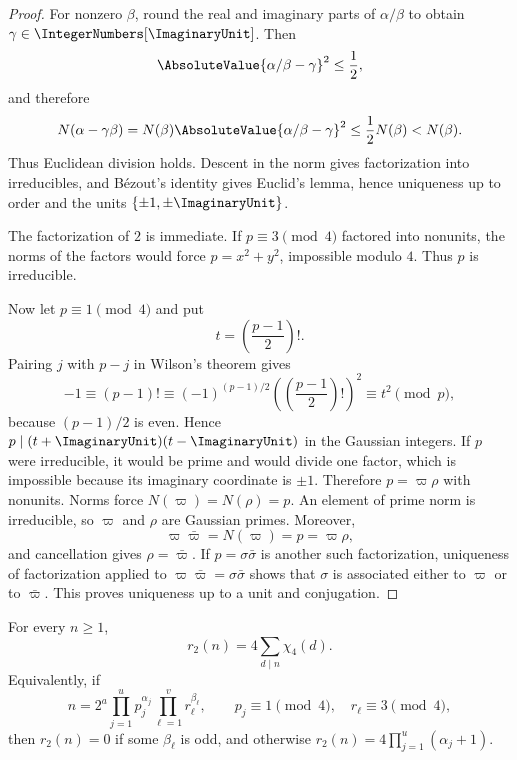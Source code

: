 \begin{proof}
For nonzero $\beta$, round the real and imaginary parts of $\alpha/\beta$
to obtain $\gamma\in\IntegerNumbers[\ImaginaryUnit]$.  Then
\[
 \AbsoluteValue{\alpha/\beta-\gamma}^2\le\frac12,
\]
and therefore
\[
 N(\alpha-\gamma\beta)
 =N(\beta)\AbsoluteValue{\alpha/\beta-\gamma}^2
 \le\frac12N(\beta)<N(\beta).
\]
Thus Euclidean division holds.  Descent in
the norm gives factorization into irreducibles, and B\'ezout's identity gives
Euclid's lemma, hence uniqueness up to order and the units
$\{\pm1,\pm\ImaginaryUnit\}$.

The factorization of $2$ is immediate.  If $p\equiv3\pmod4$ factored into
nonunits, the norms of the factors would force $p=x^2+y^2$, impossible
modulo $4$.  Thus $p$ is irreducible.

Now let $p\equiv1\pmod4$ and put
\[
 t=\left(\frac{p-1}{2}\right)!.
\]
Pairing $j$ with $p-j$ in Wilson's theorem gives
\[
 -1\equiv(p-1)!
 \equiv(-1)^{(p-1)/2}
 \left(\left(\frac{p-1}{2}\right)!\right)^2
 \equiv t^2\pmod p,
\]
because $(p-1)/2$ is even.  Hence
$p\mid(t+\ImaginaryUnit)(t-\ImaginaryUnit)$ in the Gaussian integers.
If $p$ were irreducible, it would be prime and would divide one factor, which
is impossible because its imaginary coordinate is $\pm1$.  Therefore
$p=\varpi\rho$ with nonunits.  Norms force
$N(\varpi)=N(\rho)=p$.  An element of prime norm is irreducible, so $\varpi$ and
$\rho$ are Gaussian primes.  Moreover,
\[
 \varpi\bar\varpi=N(\varpi)=p=\varpi\rho,
\]
and cancellation gives $\rho=\bar\varpi$.  If
$p=\sigma\bar\sigma$ is another such factorization, uniqueness of
factorization applied to $\varpi\bar\varpi=\sigma\bar\sigma$ shows that $\sigma$
is associated either to $\varpi$ or to $\bar\varpi$.  This proves uniqueness up to
a unit and conjugation.
\end{proof}

\begin{theorem}
\label{qg:thm-two-square}
For every $n\ge1$,
\begin{equation}
 r_2(n)=4\sum_{d\mid n}\chi_4(d).
\label{eq:qg-two-square}
\end{equation}
Equivalently, if
\[
 n=2^a\prod_{j=1}^{u}p_j^{\alpha_j}
       \prod_{\ell=1}^{v}r_\ell^{\beta_\ell},
 \qquad
 p_j\equiv1\pmod4,\quad r_\ell\equiv3\pmod4,
\]
then $r_2(n)=0$ if some $\beta_\ell$ is odd, and otherwise
$r_2(n)=4\prod_{j=1}^{u}(\alpha_j+1)$.
\end{theorem}

